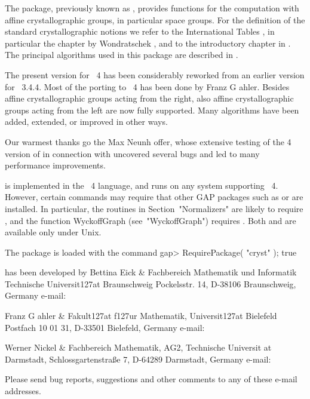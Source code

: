 

The {\Cryst} package, previously known as , provides 
functions for the computation with affine crystallographic groups, 
in particular space groups. For the definition of the standard 
crystallographic notions we refer to the International Tables 
\cite{Hah95}, in particular the chapter by Wondratschek \cite{Won95},
and to the introductory chapter in \cite{BBNWZ78}. The principal 
algorithms used in this package are described in \cite{EGN97}.

The present version for {\GAP}~4 has been considerably reworked from
an earlier version for {\GAP}~3.4.4. Most of the porting to {\GAP}~4
has been done by Franz G{ a}hler. Besides affine crystallographic
groups acting from the right, also affine crystallographic groups acting 
from the left are now fully supported. Many algorithms have been added, 
extended, or improved in other ways.

Our warmest thanks go the Max Neunh{ o}ffer, whose extensive
testing of the {\GAP} 4 version of {\Cryst} in connection with {\XGAP} 
uncovered several bugs and led to many performance improvements.

{\Cryst} is implemented in the {\GAP}~4 language, and runs on any 
system supporting {\GAP}~4. However, certain commands may require 
that other GAP packages such as {\CARAT} or {\XGAP} are installed.
In particular, the routines in Section~"Normalizers" are likely
to require {\CARAT}, and the function WyckoffGraph (see~"WyckoffGraph")
requires {\XGAP}. Both {\CARAT} and {\XGAP} are available only under Unix.

The {\Cryst} package is loaded with the command
\beginexample 
gap> RequirePackage( "cryst" ); 
true
\endexample

{\Cryst} has been developed by
\beginitems
Bettina Eick &
Fachbereich Mathematik und Informatik\hfil\break
Technische Universit\accent127at Braunschweig\hfil\break
Pockelsstr. 14, D-38106 Braunschweig, Germany\hfil\break
e-mail: 

Franz G{ a}hler &
Fakult\accent127at f\accent127ur Mathematik, 
Universit\accent127at Bielefeld\hfil\break
Postfach 10 01 31, D-33501 Bielefeld, Germany\hfil\break
e-mail: 

Werner Nickel &
Fachbereich Mathematik, AG2,
Technische Universit{ a}t Darmstadt, \hfill\break
Schlossgartenstra{\ss}e 7, D-64289 Darmstadt, Germany \hfil\break
e-mail: 
\enditems

Please send bug reports, suggestions and other comments to any of these
e-mail addresses.







